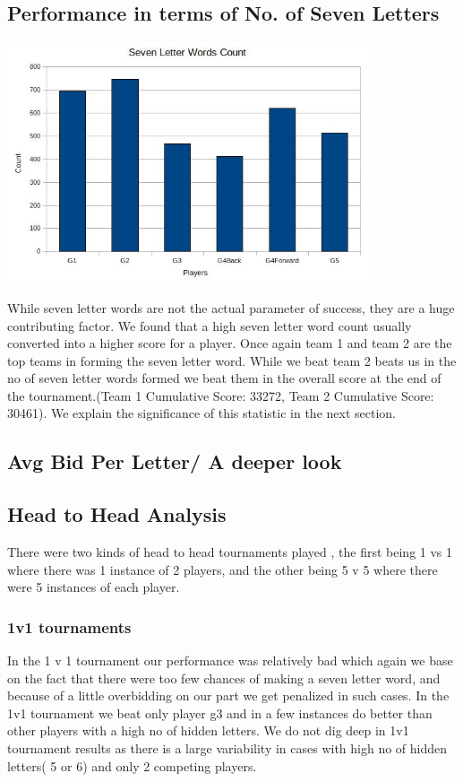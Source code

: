 \documentclass[11pt]{article}
\begin{document}
	\subsection{Performance in terms of No. of Seven Letters}
	
	\includegraphics[width=0.8\textwidth]{SevenCount}
	
	While seven letter words are not the actual parameter of success, they are a huge contributing factor. We found that a high seven letter word count usually converted into a higher score for a player. Once again team 1 and team 2 are the top teams in forming the seven letter word. While we beat team 2 beats us in the no of seven letter words formed we beat them in the overall score at the end of the tournament.(Team 1 Cumulative Score: 33272, Team 2 Cumulative Score: 30461). We explain the significance of this statistic in the next section.
	\subsection{Avg Bid Per Letter/ A deeper look}
	\subsection{Head to Head Analysis}
	There were two kinds of head to head tournaments played , the first being 1 vs 1 where there was 1 instance of 2 players, and the other being 5 v 5 where there were 5 instances of each player. 

\subsubsection{1v1 tournaments}	
	In the 1 v 1 tournament our performance was relatively bad which again we base on the fact that there were too few chances of making a seven letter word, and because of a little overbidding on our part we get penalized in such cases. In the 1v1 tournament we beat only player g3 and in a few instances do better than other players with a high no of hidden letters. We do not dig deep in 1v1 tournament results as there is a large variability in cases with high no of hidden letters( 5 or 6) and only 2 competing players. 
\end{document}
